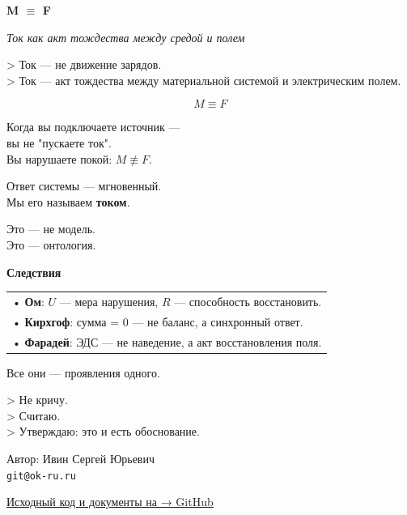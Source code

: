 \documentclass[12pt]{article}
\begin{document}
\begin{center}
\LARGE\textbf{M $\equiv$ F}

\bigskip

\large\textit{Ток как акт тождества между средой и полем}

\bigskip

> \large Ток — не движение зарядов. \\
> \large Ток — акт тождества между материальной системой и электрическим полем.

\bigskip

\[
\boxed{M \equiv F}
\]

\bigskip

Когда вы подключаете источник — \\
вы не "пускаете ток". \\
Вы нарушаете покой: \( M \not\equiv F \).  

Ответ системы — мгновенный. \\
Мы его называем \textbf{током}.

Это — не модель. \\
Это — онтология.

\bigskip\bigskip

\textbf{Следствия}

\medskip

\begin{tabular}{@{}l@{}}
• \textbf{Ом}: $ U $ — мера нарушения, $ R $ — способность восстановить. \\
• \textbf{Кирхгоф}: сумма = 0 — не баланс, а синхронный ответ. \\
• \textbf{Фарадей}: ЭДС — не наведение, а акт восстановления поля.
\end{tabular}

\medskip

Все они — проявления одного.


\bigskip

> Не кричу. \\
> Считаю. \\
> Утверждаю: это и есть обоснование.

\bigskip

Автор: Ивин Сергей Юрьевич \\
\texttt{git@ok-ru.ru}

\medskip

\href{https://github.com/OKRUgit/ivin-reflex-2026}{Исходный код и документы на → GitHub}

\end{center}
\end{document}
